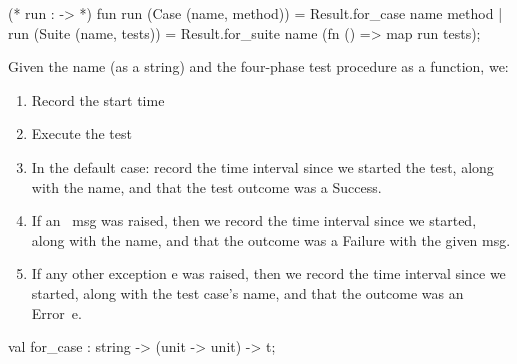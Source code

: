 \nwenddocs{}\endmoddef\nwstartdeflinemarkup{}\nwenddeflinemarkup
(* run :  ->  *)
fun run (Case (name, method)) = Result.for_case name method
  | run (Suite (name, tests)) =
      Result.for_suite name (fn () => map run tests);
\eatline
{}\nwendcode{}\nwdocspar
\begin{node}
Given the name (as a string) and the four-phase test procedure as a
function, we:
\begin{enumerate}
\item Record the start time
\item Execute the test
\item In the default case: record the time interval since we started
  the test, along with the name, and that the test outcome was a {\Tt{}Success\nwendquote}.
\item If an {\Tt{}\ msg\nwendquote} was raised, then we record the time
  interval since we started, along with the name, and that the outcome
  was a {\Tt{}Failure\nwendquote} with the given {\Tt{}msg\nwendquote}.
\item If any other exception {\Tt{}e\nwendquote} was raised, then we record the time
  interval since we started, along with the test case's name, and that
  the outcome was an {\Tt{}Error\ e\nwendquote}.
\end{enumerate}
\end{node}

\nwenddocs{}\plusendmoddef\nwstartdeflinemarkup{}\nwenddeflinemarkup
val for_case : string -> (unit -> unit) -> t;
\nwendcode{}\nwdocspar

